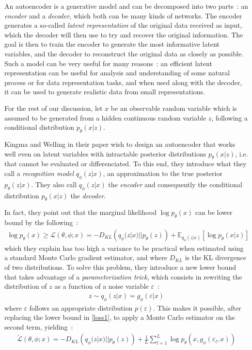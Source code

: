 \documentclass{article} %
\begin{document}
An autoencoder is a generative model and can be decomposed into
two parts~: an \emph{encoder} and a \emph{decoder}, which both can be many kinds
of networks. The encoder generates a so-called \emph{latent representation} of
the original data received as input, which the decoder will then use to try and
recover the original information. The goal is then to train the encoder to
generate the most informative latent variables, and the decoder to reconstruct
the original data as closely as possible. Such a model can be very useful for
many reasons~: an efficient latent representation can be useful for analysis and
understanding of some natural process or for data representation tasks, and when
used along with the decoder, it can be used to generate realistic data from small
representations.

For the rest of our discussion, let $x$ be an observable random
variable which is assumed to be generated from a hidden continuous random
variable $z$, following a conditional distribution $p_\theta(x|z)$.

Kingma and Welling in their paper wish to design an autoencoder that works well
even on latent variables with intractable posterior distributions
$p_\theta(x|z)$, i.e. that cannot be evaluated or differenciated. To this end,
they introduce what they call a \emph{recognition
  model} $q_\phi(z|x)$, an approximation to the true posterior $p_\theta(z|x)$.
They also call $q_\phi(z|x)$ the \emph{encoder} and consequently the conditional
distribution $p_\theta(x|z)$ the \emph{decoder}.

In fact, they point out that the marginal likelihood $\log p_\theta(x)$ can be
lower bound by the following~:
\begin{align}\label{loss1}
  \log p_\theta(x)\geq \mathcal{L}(\theta, \phi; x)=-D_{KL}\left(
  q_\phi(z|x)||p_\theta(z) \right)+\mathbb{E}_{q_\phi(z|x)}\left[ \log p_\theta(x|z) \right]
\end{align}
which they explain has too high a variance to be practical when estimated using
a standard Monte Carlo gradient estimator, and where $D_{KL}$ is
the KL divergence of two distributions. To solve this problem, they introduce a
new lower bound that takes advantage of a \emph{parameterization trick}, which
consists in rewriting the distribution of $z$ as a function of a noise
variable $\varepsilon$~:
\begin{align}\label{reparam}
z\sim q_\phi(z|x)=g_\phi(\varepsilon|x)
\end{align}
where $\varepsilon$ follows an appropriate distribution $p(\varepsilon)$. This
makes it possible, after replacing the lower bound in 
\ref{loss1}, to apply a Monte Carlo
estimator on the second term, yielding~:
\begin{align}\label{loss2}
\tilde{\mathcal{L}}(\theta,\phi;x)=-D_{KL}\left(
  q_\phi(z|x)||p_\theta(z) \right)+\frac{1}{L}\sum_{l=1}^{L}\log p_\theta(x, g_\phi(\varepsilon_l,x))
\end{align}
\end{document}
